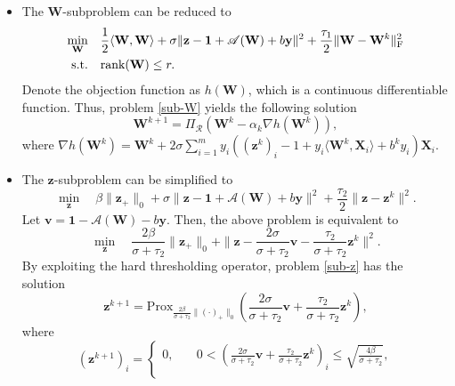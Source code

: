 \documentclass[sn-mathphys]{JORSC-jnl}%
\theoremstyle{thmstyleone}%
\theoremstyle{thmstylethree}%
\theoremstyle{thmstyleone} %
\begin{document}
\begin{itemize}
    \item The $\mathbf{W}$-subproblem can be reduced to 
\begin{equation}\label{sub-W}
	\begin{aligned}
 \min\limits_{\mathbf W}\quad
&\frac{1}{2}\langle\mathbf{W},\mathbf{W}\rangle+\sigma\|{\mathbf{z}}-{\mathbf{1}}+\mathscr{A}(\mathbf{W})+b\mathbf{y}\|^{2}+\frac{\tau_{1}}{2}\|\mathbf{W}-\mathbf{W}^k\|_\textrm{F}^2\\
{\rm s.t.}\quad & \text{rank}(\mathbf{W}) \leq r.
 	\end{aligned}
\end{equation}
Denote the objection function as $h(\mathbf{W})$, which is a continuous differentiable function.
Thus, problem \eqref{sub-W} yields the following solution
\begin{equation*}	
\mathbf{W}^{k+1}=\Pi_{\mathcal{R}}(\mathbf{W}^k-\alpha_k\nabla h(\mathbf{W}^k)),
\end{equation*}
where $\nabla h(\mathbf{W}^k)=\mathbf{W}^k+2\sigma\sum_{i=1}^m{y}_{i}((\mathbf{z}^k)_i-1+{y}_i\langle \mathbf{W}^k, \mathbf{X}_i \rangle +b^k{y}_i)
\mathbf{X}_i.$ 
    \item The $\mathbf{z}$-subproblem can be simplified to
\begin{equation}\label{sub-z}
    \min\limits_{{\mathbf{z}}}\quad
	\beta\|{\mathbf{z}}_+\|_0+\sigma\|{\mathbf{z}}-{\mathbf{1}}+\mathscr{A}(\mathbf{W})+b\mathbf{y}\|^{2}+\frac{\tau_{2}}{2}\|\mathbf{z}-\mathbf{z}^k\|^2.
\end{equation}
Let $\mathbf{v}={\mathbf{1}}-\mathscr{A}(\mathbf{W})-b\mathbf{y}$. Then, the above problem  is equivalent to 
\begin{equation*}  
\min\limits_{{\mathbf{z}}}\quad \frac{2\beta}{\sigma+\tau_2}\|{\mathbf{z}}_+\|_0+\|{\mathbf{z}}-\frac{2\sigma}{\sigma+\tau_2}\mathbf{v}-\frac{\tau_2}{\sigma+\tau_2}\mathbf{z}^k\|^2.
\end{equation*} 
By exploiting the hard thresholding operator, problem \eqref{sub-z} has the solution
\begin{equation*}
	\mathbf{z}^{k+1}= \mathrm{Prox}_{\frac{2\beta}{\sigma+\tau_2}\|(\cdot)_+ \|_0} (\frac{2\sigma}{\sigma+\tau_2}\mathbf{v}+\frac{\tau_2}{\sigma+\tau_2}\mathbf{z}^k),\nonumber
\end{equation*} 
where 
\begin{equation*}
	(\mathbf{z}^{k+1})_i=\begin{cases}
	0, &\quad 0<	(\frac{2\sigma}{\sigma+\tau_2}\mathbf{v}+\frac{\tau_2}{\sigma+\tau_2}\mathbf{z}^k)_i\leq \sqrt{\frac{4\beta}{\sigma+\tau_2}},\\

\end{cases}
\end{equation*}
\end{itemize}
\end{document}
